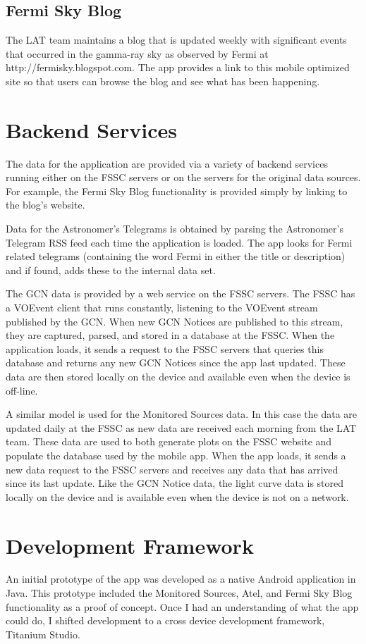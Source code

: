 \subsection{Fermi Sky Blog}
The LAT team maintains a blog that is updated weekly with significant events that occurred in the gamma-ray sky as observed by Fermi at http://fermisky.blogspot.com.  The app provides a link to this mobile optimized site so that users can browse the blog and see what has been happening.

\section{Backend Services}
The data for the application are provided via a variety of backend services running either on the FSSC servers or on the servers for the original data sources.  For example, the Fermi Sky Blog functionality is provided simply by linking to the blog's website.

Data for the Astronomer's Telegrams is obtained by parsing the Astronomer's Telegram RSS feed each time the application is loaded.  The app looks for Fermi related telegrams (containing the word Fermi in either the title or description) and if found, adds these to the internal data set.

The GCN data is provided by a web service on the FSSC servers.  The FSSC has a VOEvent client that runs constantly, listening to the VOEvent stream published by the GCN.  When new GCN Notices are published to this stream, they are captured, parsed, and stored in a database at the FSSC.  When the application loads, it sends a request to the FSSC servers that queries this database and returns any new GCN Notices since the app last updated.  These data are then stored locally on the device and available even when the device is off-line.

A similar model is used for the Monitored Sources data.  In this case the data are updated daily at the FSSC as new data are received each morning from the LAT team.  These data are used to both generate plots on the FSSC website and populate the database used by the mobile app.  When the app loads, it sends a new data request to the FSSC servers and receives any data that has arrived since its last update.  Like the GCN Notice data, the light curve data is stored locally on the device and is available even when the device is not on a network.

\section{Development Framework}
An initial prototype of the app was developed as a native Android application in Java.  This prototype included the Monitored Sources, Atel, and Fermi Sky Blog functionality as a proof of concept.  Once I had an understanding of what the app could do, I shifted development to a cross device development framework, Titanium Studio.  

